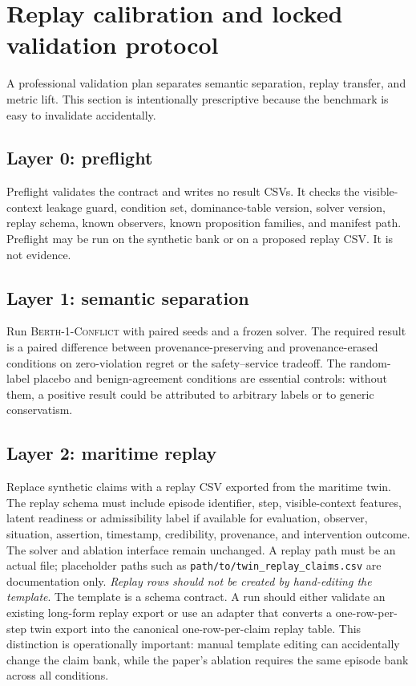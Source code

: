 \documentclass[11pt]{article}
\newcommand{\1}{\mathbf{1}}
\theoremstyle{definition}
\theoremstyle{plain}
\theoremstyle{remark}
\begin{document}
\section{Replay calibration and locked validation protocol}
\label{sec:validation}

A professional validation plan separates semantic separation, replay transfer, and metric lift. This section is intentionally prescriptive because the benchmark is easy to invalidate accidentally.

\subsection{Layer 0: preflight}

Preflight validates the contract and writes no result CSVs. It checks the visible-context leakage guard, condition set, dominance-table version, solver version, replay schema, known observers, known proposition families, and manifest path. Preflight may be run on the synthetic bank or on a proposed replay CSV. It is not evidence.

\subsection{Layer 1: semantic separation}

Run \textsc{Berth-1-Conflict} with paired seeds and a frozen solver. The required result is a paired difference between provenance-preserving and provenance-erased conditions on zero-violation regret or the safety--service tradeoff. The random-label placebo and benign-agreement conditions are essential controls: without them, a positive result could be attributed to arbitrary labels or to generic conservatism.

\subsection{Layer 2: maritime replay}

Replace synthetic claims with a replay CSV exported from the maritime twin. The replay schema must include episode identifier, step, visible-context features, latent readiness or admissibility label if available for evaluation, observer, situation, assertion, timestamp, credibility, provenance, and intervention outcome. The solver and ablation interface remain unchanged. A replay path must be an actual file; placeholder paths such as \texttt{path/to/twin\_replay\_claims.csv} are documentation only. \emph{Replay rows should not be created by hand-editing the template}. The template is a schema contract. A run should either validate an existing long-form replay export or use an adapter that converts a one-row-per-step twin export into the canonical one-row-per-claim replay table. This distinction is operationally important: manual template editing can accidentally change the claim bank, while the paper's ablation requires the same episode bank across all conditions.
\end{document}
